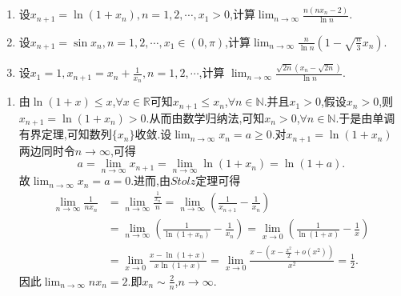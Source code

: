 \documentclass[lang=cn,newtx,10pt,scheme=chinese]{elegantbook}
\begin{document}
\begin{example}
\begin{enumerate}
\item 设\(x_{n + 1} = \ln(1 + x_n), n = 1, 2, \cdots, x_1 > 0\),计算\(\lim_{n \to \infty} \frac{n(nx_n - 2)}{\ln n}\).

\item 设\(x_{n + 1} = \sin x_n, n = 1, 2, \cdots, x_1 \in (0, \pi)\),计算\(\lim_{n \to \infty} \frac{n}{\ln n}(1 - \sqrt{\frac{n}{3}}x_n)\).

\item 设\(x_1 = 1, x_{n + 1} = x_n + \frac{1}{x_n}, n = 1, 2, \cdots\),计算
\(\lim_{n \to \infty} \frac{\sqrt{2n}(x_n - \sqrt{2n})}{\ln n}\).
\end{enumerate}
\end{example}
\begin{solution}
\begin{enumerate}
\item 由\(\ln(1 + x) \leq x\),\(\forall x\in\mathbb{R}\)可知\(x_{n + 1} \leq x_n\),\(\forall n\in\mathbb{N}\).并且\(x_1 > 0\),假设\(x_n > 0\),则\(x_{n + 1} = \ln(1 + x_n) > 0\).从而由数学归纳法,可知\(x_n > 0\),\(\forall n\in\mathbb{N}\).于是由单调有界定理,可知数列\(\{x_n\}\)收敛.设\(\lim_{n\rightarrow\infty}x_n = a\geq0\).对\(x_{n + 1} = \ln(1 + x_n)\)两边同时令\(n\rightarrow\infty\),可得
\[
a = \lim_{n\rightarrow\infty}x_{n + 1} = \lim_{n\rightarrow\infty}\ln(1 + x_n) = \ln(1 + a).
\]
故\(\lim_{n\rightarrow\infty}x_n = a = 0\).进而,由\(Stolz\)定理可得
\begin{align*}
\lim_{n\rightarrow\infty}\frac{1}{nx_n}&=\lim_{n\rightarrow\infty}\frac{\frac{1}{x_n}}{n}=\lim_{n\rightarrow\infty}\left(\frac{1}{x_{n + 1}} - \frac{1}{x_n}\right)\\
&=\lim_{n\rightarrow\infty}\left(\frac{1}{\ln(1 + x_n)} - \frac{1}{x_n}\right)=\lim_{x\rightarrow0}\left(\frac{1}{\ln(1 + x)} - \frac{1}{x}\right)\\
&=\lim_{x\rightarrow0}\frac{x - \ln(1 + x)}{x\ln(1 + x)}=\lim_{x\rightarrow0}\frac{x - \left(x - \frac{x^2}{2} + o(x^2)\right)}{x^2}=\frac{1}{2}.
\end{align*}
因此\(\lim_{n\rightarrow\infty}nx_n = 2\).即\(x_n\sim\frac{2}{n}\),\(n\rightarrow\infty\).


\end{enumerate}
\end{solution}
\end{document}
